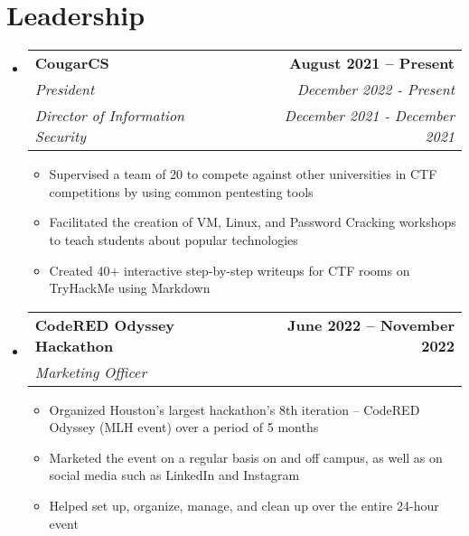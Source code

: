 \documentclass[letterpaper,11pt]{article}
\makeatletter
\newcommand{\resumeItem}[1]{
  \item\small{
    {#1 \vspace{-2pt}}
  }
}
\newcommand{\resumeSubheading}[4]{
  \vspace{-2pt}\item
    \begin{tabular*}{1.0\textwidth}[t]{l@{\extracolsep{\fill}}r}
      \textbf{#1} & \textbf{\small #2} \\
      \textit{\small#3} & \textit{\small #4} \\
    \end{tabular*}\vspace{-7pt}
}
\newcommand{\resumeSubheadingTwoRoles}[6]{
  \vspace{-2pt}\item
    \begin{tabular*}{1.0\textwidth}[t]{l@{\extracolsep{\fill}}r}
      \textbf{#1} & \textbf{\small #2} \\
      \textit{\small#3} & \textit{\small #4} \\
      \textit{\small#5} & \textit{\small #6} \\
    \end{tabular*}\vspace{-7pt}
}
\newcommand{\resumeSubHeadingListStart}{\begin{itemize}[leftmargin=0.0in, label={}]}
\newcommand{\resumeSubHeadingListEnd}{\end{itemize}}
\newcommand{\resumeItemListStart}{\begin{itemize}}
\newcommand{\resumeItemListEnd}{\end{itemize}\vspace{-5pt}}
\makeatother
\begin{document}
\section{Leadership}
    \resumeSubHeadingListStart
        \resumeSubheadingTwoRoles{CougarCS}{August 2021 -- Present}{President}{December 2022 - Present}{Director of Information Security}{December 2021 - December 2021}
            \resumeItemListStart
                \resumeItem{Supervised a team of 20 to compete against other universities in CTF competitions by using common pentesting tools}
                \resumeItem{Facilitated the creation of VM, Linux, and Password Cracking workshops to teach students about popular technologies}
                \resumeItem{Created 40+ interactive step-by-step writeups for CTF rooms on TryHackMe using Markdown}
            \resumeItemListEnd
        \resumeSubheading{CodeRED Odyssey Hackathon}{June 2022 -- November 2022}{Marketing Officer}{}
            \resumeItemListStart
                \resumeItem{Organized Houston’s largest hackathon’s 8th iteration – CodeRED Odyssey (MLH event) over a period of 5 months}
                \resumeItem{Marketed the event on a regular basis on and off campus, as well as on social media such as LinkedIn and Instagram}
                \resumeItem{Helped set up, organize, manage, and clean up over the entire 24-hour event}
            \resumeItemListEnd
        
    \resumeSubHeadingListEnd


\end{document}
